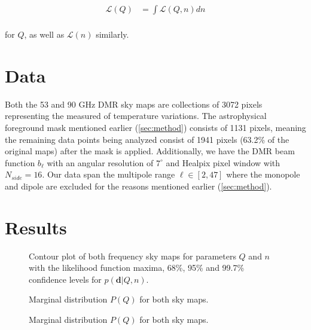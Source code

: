 \documentclass{emulateapj}
\begin{document}
\begin{equation}
\label{lQ}
\begin{array}{rl}
\mathcal{L}(Q) &= \int \mathcal{L}(Q,n)dn  \\ 
\end{array}
\end{equation}  

\noindent 
for $Q$, as well as $\mathcal{L}(n)$ similarly.

 

\section{Data}
\label{sec:data}


Both the 53 and 90 GHz DMR sky maps are collections of 3072 pixels representing the measured of temperature variations. The  astrophysical foreground mask mentioned earlier (\ref{sec:method}) consists of 1131 pixels, meaning the remaining data points being analyzed consist of 1941 pixels (63.2\% of the original maps) after the mask is applied. Additionally, we have the DMR beam function $b_{\ell}$ with an angular resolution of $7^{\circ}$ and Healpix pixel window with $N_{side} = 16$. Our data span the multipole range $\ell \in [2,47]$ where the monopole and dipole are excluded for the reasons mentioned earlier (\ref{sec:method}).  






\section{Results}
\label{sec:results}

\begin{figure}[t]
	
	\mbox{}
	
	\caption{Contour plot of both frequency sky maps for parameters $Q$ and $n$ with the likelihood function maxima, 68\%, 95\% and 99.7\% confidence levels for $p(\textbf{d}|Q,n)$. }
	\label{fig:contour}
\end{figure}

\begin{figure}[t]	
	\mbox{}	
	\caption{Marginal distribution $P(Q)$ for both sky maps.}
	\label{fig:PQ}
\end{figure}

\begin{figure}[t]	
	\mbox{}	
	\caption{Marginal distribution $P(Q)$ for both sky maps.}
	\label{fig:Pn}
\end{figure}
\end{document}
